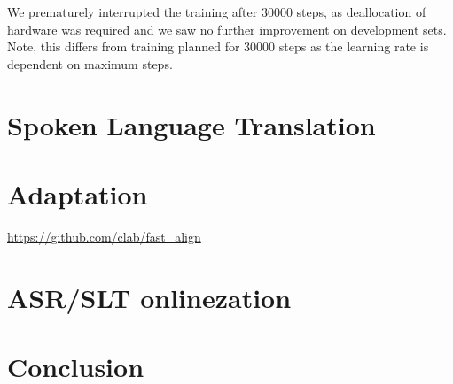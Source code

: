 We prematurely interrupted the training after 30000 steps, as deallocation of hardware was required and we saw no further improvement on development sets. Note, this differs from training planned for 30000 steps as the learning rate is dependent on maximum steps.



\chapter{Spoken Language Translation}
\label{chap:slt}

\chapter{Adaptation}
\label{chap:adaptation}
\url{https://github.com/clab/fast_align}

\chapter{ASR/SLT onlinezation}
\label{chap:onlinezation}

\chapter*{Conclusion}
\label{chap:conclusion}